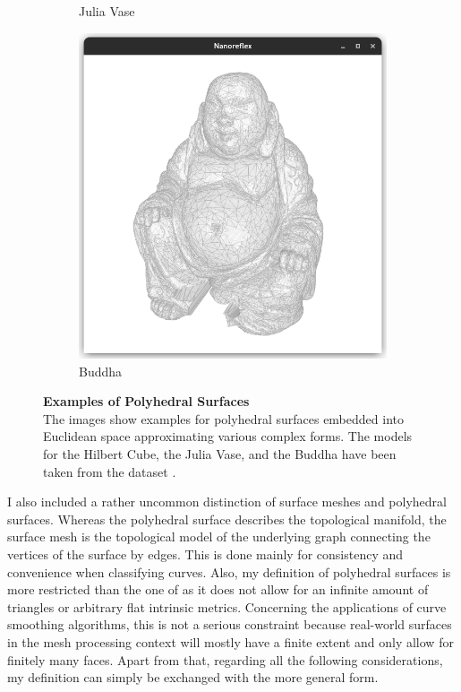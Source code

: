 \documentclass{stdlocal}
\begin{document}
\begin{figure}
\begin{subfigure}[b]{0.23\linewidth}
      \caption{Julia Vase}
    \end{subfigure}
    \hfill
    \begin{subfigure}[b]{0.23\linewidth}
      \centering
      \includegraphics[width=\linewidth,trim={25px 20 25 50},clip]{images/polyhedral-surface-buddha.png}
      \caption{Buddha}
    \end{subfigure}
    \caption[Examples of Polyhedral Surfaces]{%
      \textbf{Examples of Polyhedral Surfaces}\\
      The images show examples for polyhedral surfaces embedded into Euclidean space approximating various complex forms.
      The models for the Hilbert Cube, the Julia Vase, and the Buddha have been taken from the  dataset \autocite{thingi10k}.
    }
    \label{fig:polyhedral-surface-examples}
  \end{figure}

  I also included a rather uncommon distinction of surface meshes and polyhedral surfaces.
  Whereas the polyhedral surface describes the topological manifold, the surface mesh is the topological model of the underlying graph connecting the vertices of the surface by edges.
  This is done mainly for consistency and convenience when classifying curves.
  Also, my definition of polyhedral surfaces is more restricted than the one of \textcite{polthier2006} as it does not allow for an infinite amount of triangles or arbitrary flat intrinsic metrics.
  Concerning the applications of curve smoothing algorithms, this is not a serious constraint because real-world surfaces in the mesh processing context will mostly have a finite extent and only allow for finitely many faces.
  Apart from that, regarding all the following considerations, my definition can simply be exchanged with the more general form.
\end{document}
